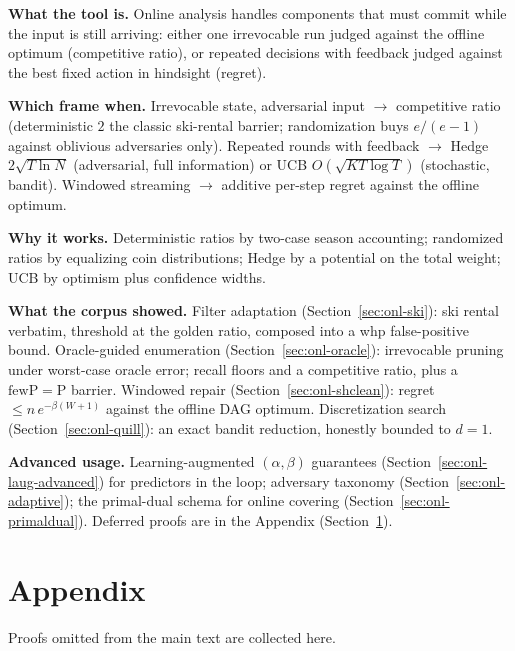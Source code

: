 \begin{recap}
\item \textbf{What the tool is.} Online analysis handles components that must
  commit while the input is still arriving: either one irrevocable run judged
  against the offline optimum (competitive ratio), or repeated decisions with
  feedback judged against the best fixed action in hindsight (regret).
\item \textbf{Which frame when.} Irrevocable state, adversarial input
  $\to$ competitive ratio (deterministic $2$ the classic ski-rental barrier;
  randomization buys $e/(e-1)$ against oblivious adversaries only). Repeated
  rounds with feedback $\to$ Hedge $2\sqrt{T\ln N}$ (adversarial, full
  information) or UCB $O(\sqrt{KT\log T})$ (stochastic, bandit). Windowed
  streaming $\to$ additive per-step regret against the offline optimum.
\item \textbf{Why it works.} Deterministic ratios by two-case season
  accounting; randomized ratios by equalizing coin distributions; Hedge by a
  potential on the total weight; UCB by optimism plus confidence widths.
\item \textbf{What the corpus showed.} Filter adaptation
  (Section~\ref{sec:onl-ski}): ski rental verbatim, threshold at the golden
  ratio, composed into a whp false-positive bound. Oracle-guided enumeration
  (Section~\ref{sec:onl-oracle}): irrevocable pruning under worst-case oracle
  error; recall floors and a competitive ratio, plus a $\mathrm{fewP} =
  \mathrm{P}$ barrier. Windowed repair (Section~\ref{sec:onl-shclean}): regret
  $\le n\,e^{-\beta(W+1)}$ against the offline DAG optimum. Discretization
  search (Section~\ref{sec:onl-quill}): an exact bandit reduction, honestly
  bounded to $d = 1$.
\item \textbf{Advanced usage.} Learning-augmented $(\alpha,\beta)$ guarantees
  (Section~\ref{sec:onl-laug-advanced}) for predictors in the loop; adversary
  taxonomy (Section~\ref{sec:onl-adaptive}); the primal-dual schema for
  online covering (Section~\ref{sec:onl-primaldual}). Deferred proofs are in
  the Appendix (Section~\ref{sec:onl-appendix}).
\end{recap}

\section{Appendix}
\label{sec:onl-appendix}

Proofs omitted from the main text are collected here.

